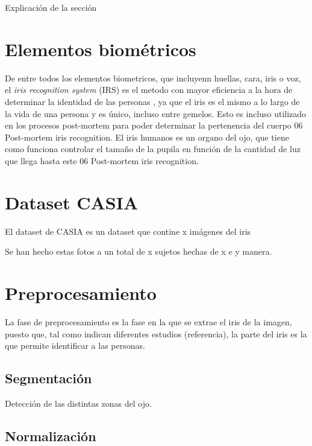 
Explicación de la sección


\section{Elementos biométricos}

De entre todos los elementos biometricos, que incluyenn huellas, cara, iris o voz, el \textit{iris recognition system} (IRS) es el metodo con mayor eficiencia a la hora de determinar la identidad
de las personas \cite{malgheet_iris_2021}, ya que el iris es el mismo a lo largo de la vida de una persona y es único, incluso entre gemelos. Esto es incluso utilizado en los procesos 
post-mortem para poder determinar la pertenencia del cuerpo 06 Post-mortem iris recognition. El iris humanos es un organo del ojo, que tiene como funciona controlar el tamaño
de la pupila en función de la cantidad de luz que llega hasta este 06 Post-mortem iris recognition.

\section{Dataset CASIA}	

El dataset de CASIA es un dataset que contine x imágenes del iris

Se han hecho estas fotos a un total de x sujetos hechas de x e y manera.




\section{Preprocesamiento}

La fase de preprocesamiento es la fase en la que se extrae el iris de la imagen, puesto que, tal como indican diferentes estudios (referencia), la parte del iris es la que 
permite identificar a las personas.

\subsection{Segmentación}

Detección de las distintas zonas del ojo.

\subsection{Normalización}

